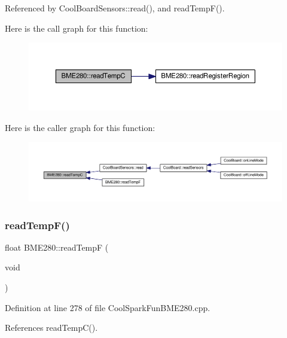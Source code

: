 Referenced by Cool\+Board\+Sensors\+::read(), and read\+Temp\+F().

Here is the call graph for this function\+:\nopagebreak
\begin{figure}[H]
\begin{center}
\leavevmode
\includegraphics[width=350pt]{df/dcf/class_b_m_e280_afffdd1d7ded9e1f92200e70669019d97_cgraph}
\end{center}
\end{figure}
Here is the caller graph for this function\+:\nopagebreak
\begin{figure}[H]
\begin{center}
\leavevmode
\includegraphics[width=350pt]{df/dcf/class_b_m_e280_afffdd1d7ded9e1f92200e70669019d97_icgraph}
\end{center}
\end{figure}
\mbox{\label{class_b_m_e280_a9648b496f6b4700550782a715a98b3c7}} 
\subsubsection{\texorpdfstring{read\+Temp\+F()}{readTempF()}}
{\footnotesize\ttfamily float B\+M\+E280\+::read\+TempF (\begin{DoxyParamCaption}\item[{void}]{ }\end{DoxyParamCaption})}



Definition at line 278 of file Cool\+Spark\+Fun\+B\+M\+E280.\+cpp.



References read\+Temp\+C().

